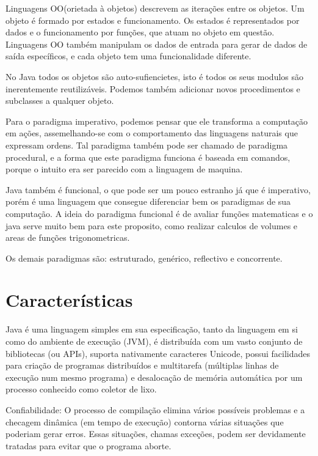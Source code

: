 \documentclass[
	12pt,				%
	openright,			%
	oneside,			%
	a4paper,			%
	english,			%
	french,				%
	spanish,			%
	brazil				%
	]{abntex2}
\begin{document}
Linguagens OO(orietada à objetos) descrevem as iterações entre os objetos. Um objeto é formado por estados e funcionamento. Os estados é representados por dados e o funcionamento por funções, que atuam no objeto em questão. Linguagens OO também manipulam os dados de entrada para gerar de dados de saída específicos, e cada objeto tem uma funcionalidade diferente.

No Java todos os objetos são auto-sufiencietes, isto é todos os seus modulos são inerentemente reutilizáveis. Podemos também adicionar novos procedimentos e
subclasses a qualquer objeto.

Para o paradigma imperativo, podemos pensar que ele transforma a computação em ações, assemelhando-se com o comportamento das linguagens naturais que expressam ordens.
Tal paradigma também pode ser chamado de paradigma procedural, e a forma que este paradigma funciona é baseada em comandos, porque o intuito era ser parecido com a linguagem de maquina.

Java também é funcional, o que pode ser um pouco estranho já que é imperativo, porém é uma linguagem que consegue diferenciar bem os paradigmas de sua computação.
A ideia do paradigma funcional é de avaliar funções matematicas e o java serve muito bem para este proposito, como realizar calculos de volumes e areas de funções trigonometricas.

Os demais paradigmas são: estruturado, genérico, reflectivo e concorrente.

{\let\clearpage\relax \chapter[Características]{Características}}

Java é uma linguagem simples em sua especificação, tanto da linguagem em si
como do ambiente de execução (JVM), é distribuída com um vasto conjunto de bibliotecas
(ou APIs), suporta nativamente caracteres Unicode, possui facilidades para criação de
programas distribuídos e multitarefa (múltiplas linhas de execução num mesmo programa) e
desalocação de memória automática por um processo conhecido como coletor de lixo.

Confiabilidade: O processo de compilação elimina vários possíveis problemas e a
checagem dinâmica (em tempo de execução) contorna várias situações que poderiam gerar
erros. Essas situações, chamas exceções, podem ser devidamente tratadas para evitar que
o programa aborte.
\end{document}
